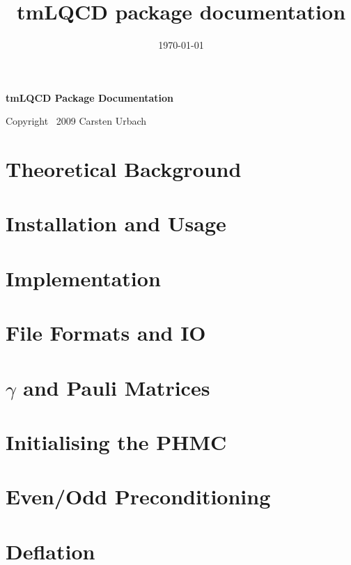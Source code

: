 \documentclass[a4paper,12pt,dvips]{article}
\date{\today}
\title{tmLQCD package documentation}
\begin{document}
\begin{center}
  {\Large\bf tmLQCD Package Documentation}\\
\end{center}

\tableofcontents

\begin{flushright}
  Copyright \textcopyright\ 2009 Carsten Urbach
\end{flushright}

\section{Theoretical Background}


\section{Installation and Usage}


\section{Implementation}




\section{File Formats and IO}

\clearpage


\clearpage

\begin{appendix}
  \section{$\gamma$  and Pauli  Matrices}

  \section{Initialising the PHMC}
  \section{Even/Odd Preconditioning}

  \section{Deflation}
\end{appendix}
\end{document}
